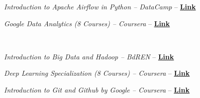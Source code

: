 \begin{inlineitems}
  \item \emph{Introduction to Apache Airflow in Python – DataCamp} – \textbf{\href{https://www.datacamp.com/completed/statement-of-accomplishment/course/d6590bcdf7655127648086dee4a6609a152446e8}{Link}}

  \item \emph{Google Data Analytics (8 Courses) – Coursera} – \textbf{\href{https://www.coursera.org/account/accomplishments/specialization/XVPVFV3WRUZY}{Link}}

    ~~\item \emph{Introduction to Big Data and Hadoop – BdREN} – \textbf{\href{https://dle.asiaconnect.bdren.net.bd/DLE-4/certificate/fDLuDCf-DLE\%204-35\%20Signed.pdf}{Link}}

  \item \emph{Deep Learning Specialization (8 Courses) – Coursera} – \textbf{\href{https://www.coursera.org/account/accomplishments/specialization/ZJE27XAAXBJA}{Link}} 

  \item \emph{Introduction to Git and Github by Google – Coursera} – \textbf{\href{https://www.coursera.org/account/accomplishments/verify/CZR8XS772VNP}{Link}} 
  
\end{inlineitems}
